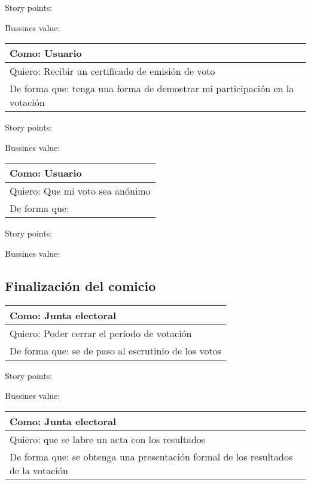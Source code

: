 \medskip
Story points:

\medskip
Bussines value:


\bigskip

\begin{tabular}{|l|}
\hline
Como: Usuario\\
\hline
Quiero: Recibir un certificado de emisi\'on de voto\\
\hline
De forma que: tenga una forma de demostrar mi participaci\'on en la votaci\'on\\
\hline
\end{tabular}

\medskip
Story points:

\medskip
Bussines value:


\bigskip

\begin{tabular}{|l|}
\hline
Como: Usuario\\
\hline
Quiero: Que mi voto sea an\'onimo\\
\hline
De forma que:  \\
\hline
\end{tabular}

\medskip
Story points:

\medskip
Bussines value:


\bigskip

\subsection{Finalizaci\'on del comicio}

\begin{tabular}{|l|}
\hline
Como: Junta electoral\\
\hline
Quiero: Poder cerrar el per\'iodo de votaci\'on\\
\hline
De forma que: se de paso al escrutinio de los votos\\
\hline
\end{tabular}

\medskip
Story points:

\medskip
Bussines value:


\bigskip

\begin{tabular}{|l|}
\hline
Como: Junta electoral\\
\hline
Quiero: que se labre un acta con los resultados\\
\hline
De forma que: se obtenga una presentaci\'on formal de los resultados de la votaci\'on \\
\hline
\end{tabular}

